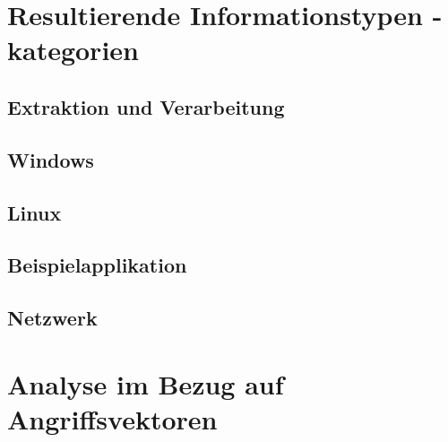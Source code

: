 \section{Resultierende Informationstypen \/ -kategorien}
\subsection{Extraktion und Verarbeitung}
\subsection{Windows}
\subsection{Linux}
\subsection{Beispielapplikation}
\subsection{Netzwerk}
\section{Analyse im Bezug auf Angriffsvektoren}